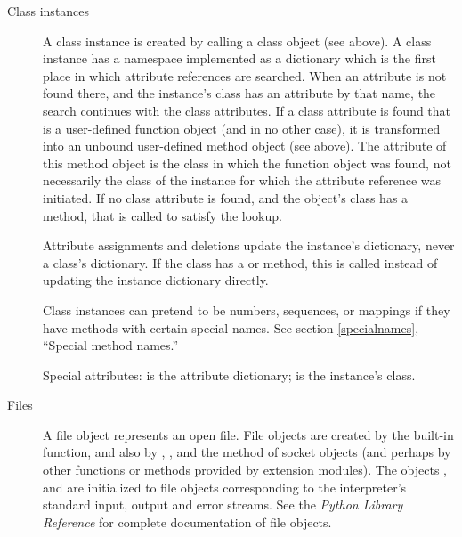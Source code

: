 \begin{description}
\item[Class instances]
A class instance is created by calling a class object (see above).
A class instance has a namespace implemented as a dictionary which
is the first place in which
attribute references are searched.  When an attribute is not found
there, and the instance's class has an attribute by that name,
the search continues with the class attributes.  If a class attribute
is found that is a user-defined function object (and in no other
case), it is transformed into an unbound user-defined method object
(see above).  The  attribute of this method object is
the class in which the function object was found, not necessarily the
class of the instance for which the attribute reference was initiated.
If no class attribute is found, and the object's class has a
 method, that is called to satisfy the lookup.

Attribute assignments and deletions update the instance's dictionary,
never a class's dictionary.  If the class has a  or
 method, this is called instead of updating the
instance dictionary directly.

Class instances can pretend to be numbers, sequences, or mappings if
they have methods with certain special names.  See
section \ref{specialnames}, ``Special method names.''

Special attributes:  is the attribute
dictionary;  is the instance's class.

\item[Files]
A file object represents an open file.  File objects are created by the
 built-in function, and also by
, , and the
 method of socket objects (and perhaps by other
functions or methods provided by extension modules).  The objects
,  and  are
initialized to file objects corresponding to the interpreter's
standard input, output and error streams.  See the \emph{Python
Library Reference} for complete documentation of file objects.


\end{description}
